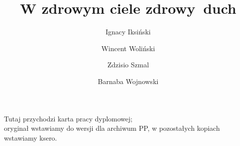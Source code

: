\documentclass[polish,bachelor,a4paper,oneside]{ppfcmthesis}
\author{%
   Ignacy Iksiński \and 
   Wincent Woliński \and 
   Zdzisio Szmal \and 
   Barnaba Wojnowski}
\title{W zdrowym ciele zdrowy~duch}                   %
\begin{document}
\frontmatter\pagestyle{empty}%
\maketitle\cleardoublepage%

\thispagestyle{empty}\vspace*{\fill}%
\begin{center}Tutaj przychodzi karta pracy dyplomowej;\\oryginał wstawiamy do wersji dla archiwum PP, w pozostałych kopiach wstawiamy ksero.\end{center}%
\vfill\cleardoublepage%

\pagestyle{ppfcmthesis}%
\tableofcontents* \cleardoublepage%

\mainmatter%





\cleardoublepage\appendix%



{\raggedright\sloppy\small}

\ppcolophon
\end{document}
